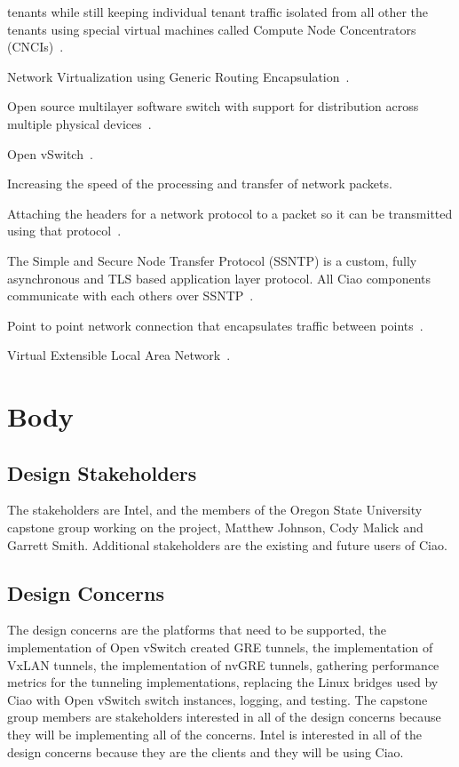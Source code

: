 \documentclass[10pt,onecolumn,journal,draftclsnofoot]{IEEEtran}
\begin{document}
\begin{description}[leftmargin=12em,style=nextline]
		tenants while still keeping individual tenant traffic isolated
		from all other the tenants using special virtual machines called
		Compute Node Concentrators (CNCIs)~\cite{ciaoNetworking}.
	\item[nvGRE]
		Network Virtualization using Generic Routing
		Encapsulation~\cite{rfc7637}.
	\item[Open vSwitch]
		Open source multilayer software switch with support for
		distribution across multiple physical devices~\cite{ovs}.
	\item[OVS]
		Open vSwitch~\cite{ovs}.
	\item[Packet Acceleration]
		Increasing the speed of the processing and transfer of network
		packets.
	\item[Packet Encapsulation]
		Attaching the headers for a network protocol to a packet so it
		can be transmitted using that
		protocol~\cite{networkingTextbook}.
	\item[SSNTP]
		The Simple and Secure Node Transfer Protocol (SSNTP) is a
		custom, fully asynchronous and TLS based application layer
		protocol. All Ciao components communicate with each others over
		SSNTP~\cite{ciaoSSNTP}.
	\item[Tunnel]
		Point to point network connection that encapsulates traffic
		between points~\cite{networkingTextbook}.
	\item[VxLAN]
		Virtual Extensible Local Area Network~\cite{rfc7348}.
\end{description}

\section{Body}
\subsection{Design Stakeholders}
The stakeholders are Intel, and the members of the Oregon State University
capstone group working on the project, Matthew Johnson, Cody Malick and Garrett
Smith. Additional stakeholders are the existing and future users of
Ciao.

\subsection{Design Concerns}
The design concerns are the platforms that need to be supported,
the implementation of Open vSwitch created GRE tunnels,
the implementation of VxLAN tunnels, the implementation of nvGRE tunnels,
gathering performance metrics for the tunneling implementations, replacing
the Linux bridges used by Ciao with Open vSwitch switch instances, logging, and
testing. The capstone group members are stakeholders interested in all of the
design concerns because they will be implementing all of the concerns. Intel is
interested in all of the design concerns because they are the clients and they
will be using Ciao.
\end{document}
